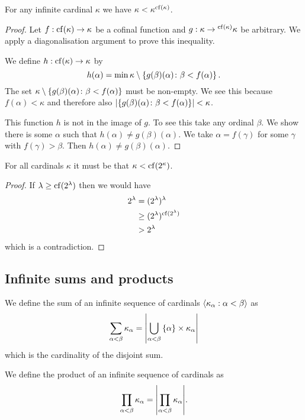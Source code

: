\begin{theorem}
    For any infinite cardinal \(\kappa\) we have
    \(\kappa<\kappa^{\cf(\kappa)}\).

    \begin{proof}
        Let \(f:\cf(\kappa)\to\kappa\) be a cofinal function and
        \(g:\kappa\to{}^{\cf(\kappa)}\kappa\) be arbitrary. We apply a
        diagonalisation argument to prove this inequality.

        We define \(h:\cf(\kappa)\to\kappa\) by
        \[
            h(\alpha)=\min\kappa\setminus\setwith{g(\beta)(\alpha)}{\beta<f(\alpha)}.
        \]
        The set \(\kappa\setminus\setwith{g(\beta)(\alpha)}{\beta<f(\alpha)}\)
        must be non-empty. We see this because \(f(\alpha)<\kappa\) and
        therefore also
        \(\abs{\setwith{g(\beta)(\alpha)}{\beta<f(\alpha)}}<\kappa\).

        This function \(h\) is not in the image of \(g\). To see this take any
        ordinal \(\beta\). We show there is some \(\alpha\) such that
        \(h(\alpha)\neq g(\beta)(\alpha)\). We take \(\alpha=f(\gamma)\) for
        some \(\gamma\) with \(f(\gamma)>\beta\). Then \(h(\alpha)\neq
        g(\beta)(\alpha)\).
    \end{proof}
\end{theorem}

\begin{corollary}
    For all cardinals \(\kappa\) it must be that \(\kappa<\cf(2^{\kappa})\).

    \begin{proof}
        If \(\lambda\geq\cf(2^{\lambda})\) then we would have
        \begin{align*}
            2^{\lambda} & =(2^{\lambda})^{\lambda}             \\
                        & \geq(2^{\lambda})^{\cf(2^{\lambda})} \\
                        & >2^{\lambda}
        \end{align*}
        which is a contradiction.
    \end{proof}
\end{corollary}

\subsection{Infinite sums and products}

\begin{definition}
    We define the sum of an infinite sequence of cardinals
    \(\sequence{\kappa_{\alpha}}{\alpha<\beta}\) as
    \[
        \sum_{\alpha<\beta}\kappa_{\alpha}=\abs*{\bigcup_{\alpha<\beta}\set{\alpha}\times\kappa_{\alpha}}
    \]
    which is the cardinality of the disjoint sum.

    We define the product of an infinite sequence of cardinals as
    \[
        \prod_{\alpha<\beta}\kappa_{\alpha}=\abs*{\prod_{\alpha<\beta}\kappa_{\alpha}}.
    \]
\end{definition}

